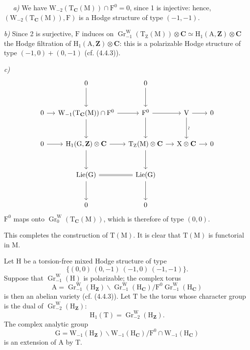 \documentclass[11pt,leqno]{article}
\newcommand{\Page}[1]{\ifvmode\noindent\else\unskip\ \fi{\footnotesize\textcolor{gray}{[p.\,#1]}}\ \ignorespaces}
\begin{document}
\Page{55}
\textit{a)} We have
\(\mathrm{W}_{-2}(\mathrm{T}_{\mathbf{C}}(\mathrm{M}))
\cap\mathrm{F}^0=0\), since 1 is injective: hence,
\((\mathrm{W}_{-2}(\mathrm{T}_{\mathbf{C}}(\mathrm{M})),\mathrm{F})\)
is a Hodge structure of type \((-1,-1)\).

\textit{b)} Since 2 is surjective, \(\mathrm{F}\) induces on
\(\operatorname{Gr}^{\mathrm{W}}_{-1}
(\mathrm{T}_{\mathrm{Z}}(\mathrm{M}))\otimes\mathbf{C}
\simeq\mathrm{H}_1(\mathrm{A},\mathbf{Z})\otimes\mathbf{C}\)
the Hodge filtration of
\(\mathrm{H}_1(\mathrm{A},\mathbf{Z})\otimes\mathbf{C}\):
this is a polarizable Hodge structure of type
\((-1,0)+(0,-1)\) (cf. (4.4.3)).

\textit{c)}
\[
\begin{tikzcd}[column sep=1.2em, row sep=2.8em]
& 0 \arrow[d] & 0 \arrow[d] & &
\\
0 \arrow[r]
&
\mathrm{W}_{-1}(\mathrm{T}_{\mathbf{C}}(\mathrm{M}))\cap\mathrm{F}^0
  \arrow[r] \arrow[d]
&
\mathrm{F}^0 \arrow[r] \arrow[d]
&
\mathrm{V} \arrow[r] \arrow[d, "\wr"]
&
0
\\
0 \arrow[r]
&
\mathrm{H}_1(\mathrm{G},\mathbf{Z})\otimes\mathbf{C}
  \arrow[r] \arrow[d]
&
\mathrm{T}_{\mathrm{Z}}(\mathrm{M})\otimes\mathbf{C}
  \arrow[r] \arrow[d]
&
\mathrm{X}\otimes\mathbf{C} \arrow[r]
&
0
\\
&
\operatorname{Lie}(\mathrm{G}) \arrow[r, equal] \arrow[d]
&
\operatorname{Lie}(\mathrm{G}) \arrow[d]
& &
\\
& 0 & 0 & &
\end{tikzcd}
\]
\(\mathrm{F}^0\) maps onto
\(\operatorname{Gr}^{\mathrm{W}}_0(\mathrm{T}_{\mathbf{C}}(\mathrm{M}))\),
which is therefore of type \((0,0)\).\par
This completes the construction of \(\mathrm{T}(\mathrm{M})\).
It is clear that \(\mathrm{T}(\mathrm{M})\) is functorial in
\(\mathrm{M}\).

Let \(\mathrm{H}\) be a torsion-free mixed Hodge structure of type
\[
\{(0,0)\ (0,-1)\ (-1,0)\ (-1,-1)\}.
\]
Suppose that \(\operatorname{Gr}^{\mathrm{W}}_{-1}(\mathrm{H})\)
is polarizable; the complex torus
\[
\mathrm{A}
=\operatorname{Gr}^{\mathrm{W}}_{-1}(\mathrm{H}_{\mathbf{Z}})\backslash
\operatorname{Gr}^{\mathrm{W}}_{-1}(\mathrm{H}_{\mathbf{C}})
/
\mathrm{F}^0\operatorname{Gr}^{\mathrm{W}}_{-1}
(\mathrm{H}_{\mathbf{C}})
\]
is then an abelian variety (cf. (4.4.3)). Let \(\mathrm{T}\) be the
torus whose character group is the dual of
\(\operatorname{Gr}^{\mathrm{W}}_{-2}(\mathrm{H}_{\mathbf{Z}})\):
\[
\mathrm{H}_1(\mathrm{T})
=\operatorname{Gr}^{\mathrm{W}}_{-2}(\mathrm{H}_{\mathbf{Z}}).
\]
The complex analytic group
\[
\mathrm{G}
=\mathrm{W}_{-1}(\mathrm{H}_{\mathbf{Z}})\backslash
\mathrm{W}_{-1}(\mathrm{H}_{\mathbf{C}})
/
\mathrm{F}^0\cap\mathrm{W}_{-1}(\mathrm{H}_{\mathbf{C}})
\]
is an extension of \(\mathrm{A}\) by \(\mathrm{T}\).
\end{document}
